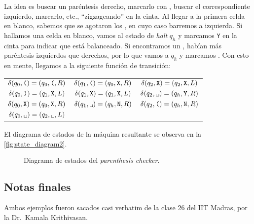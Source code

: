 \documentclass{article}
\newcommand{\lp}{\text{\tt (}}
\newcommand{\rp}{\text{\tt )}}
\newcommand{\X}{\text{\tt X}}
\newcommand{\Y}{\text{\tt Y}}
\newcommand{\N}{\text{\tt N}}
\newcommand{\blank}{\text{\tt \textvisiblespace}}
\theoremstyle{definition}
\begin{document}
La idea es buscar un paréntesis derecho, marcarlo con \X, buscar el correspondiente
izquierdo, marcarlo, etc., \enquote{zigzageando} en la cinta. Al llegar a la primera celda en
blanco, sabemos que se agotaron los \rp, en cuyo caso barremos a izquierda. Si
hallamos una celda en blanco, vamos al estado de \textit{halt} $q_h$ y marcamos
{\tt Y} en la cinta para indicar que está balanceado. Si encontramos un \lp,
habían más paréntesis izquierdos que derechos, por lo que vamos a $q_h$ y
marcamos \N. Con esto en mente, llegamos a la siguiente función de transición:

\begin{center}
 \begin{tabular}{c@{\hskip 36pt}c@{\hskip 36pt}c}
   $\delta(q_0, \lp) = (q_0, \lp, R)$ & $\delta(q_1, \lp) = (q_0, \X, R)$ & $\delta(q_2, \X) = (q_2, \X, L)$ \\
   $\delta(q_0, \rp) = (q_1, \X, L)$  & $\delta(q_1, \X) = (q_1, \X, L)$ & $\delta(q_2, \blank) = (q_h, \Y, R)$ \\
   $\delta(q_0, \X)  = (q_0, \X, R)$  & $\delta(q_1, \blank) = (q_h, \N, R)$ & $\delta(q_2, \lp) = (q_h, \N, R)$\\ 
   $\delta(q_0, \blank) = (q_2, \blank, L)$ & & 
 \end{tabular}
\end{center}

El diagrama de estados de la máquina resultante se observa en la
\autoref{fig:state_diagram2}.
\begin{figure}[ht] %
\centering %
  \caption{Diagrama de estados del \textit{parenthesis checker}.}\label{fig:state_diagram2}
\end{figure}

\subsection*{Notas finales}
Ambos ejemplos fueron sacados casi verbatim de la clase 26 del IIT Madras, por
la Dr.\ Kamala Krithivasan.


\end{document}
